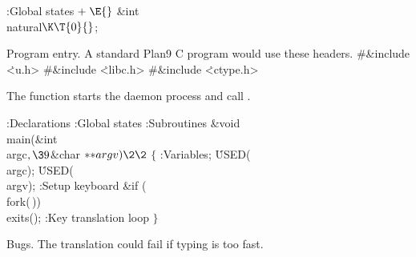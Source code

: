 \B{}:Global states\X${}\mathrel+\E{}$\6
\&{int} \\{natural}${}\K\T{0}{}$;\par
\fi

Program entry. A standard Plan9 C program would use these headers.
\Y\B\8\#\&{include} \.{<u.h>}\6
\8\#\&{include} \.{<libc.h>}\6
\8\#\&{include} \.{<ctype.h>}\par
\fi

The  function starts the daemon process and call .

\Y\B{}:Declarations\X\6
:Global states\X\6
:Subroutines\X\7
\1\1\&{void} \\{main}(\&{int} \\{argc}${},\39{}$\&{char} ${}{*}{*}\\{argv})\2%
\2{}$\6
${}\{{}$\1\6
:Variables\X;\6
\.{USED}(\\{argc});\6
\.{USED}(\\{argv});\6
:Setup keyboard\X\6
\&{if} (\\{fork}(\,))\1\5
\\{exits}();\2\6
:Key translation loop\X\6
\4${}\}{}$\2\par
\fi

Bugs. The translation could fail if typing is too fast.
\fi

\inx
\fin
\con
